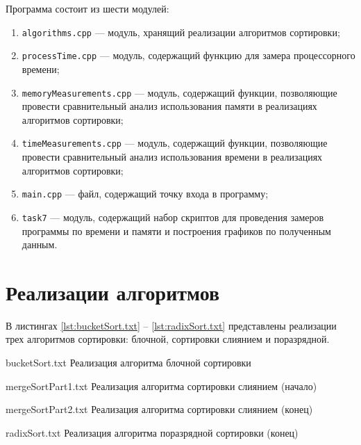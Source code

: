Программа состоит из шести модулей: 

\begin{enumerate}[label={\arabic*)}]
	\item \texttt{algorithms.cpp} --- модуль, хранящий реализации алгоритмов сортировки;
	\item \texttt{processTime.cpp} --- модуль, содержащий функцию для замера процессорного времени;
	\item \texttt{memoryMeasurements.cpp} --- модуль, содержащий функции, позволяющие провести сравнительный анализ использования памяти в реализациях алгоритмов сортировки;
	\item \texttt{timeMeasurements.cpp} --- модуль, содержащий функции, позволяющие провести сравнительный анализ использования времени в реализациях алгоритмов сортировки;
	\item \texttt{main.cpp} --- файл, содержащий точку входа в программу;
	\item \texttt{task7} --- модуль, содержащий набор скриптов для проведения замеров программы по времени и памяти и построения графиков по полученным данным.
\end{enumerate}

\clearpage

\section{Реализации алгоритмов}

В листингах \ref{lst:bucketSort.txt} -- \ref{lst:radixSort.txt} представлены реализации трех алгоритмов сортировки: блочной, сортировки слиянием и поразрядной.

{bucketSort.txt} %
{Реализация алгоритма блочной сортировки} %

\clearpage

{mergeSortPart1.txt} %
{Реализация алгоритма сортировки слиянием (начало)} %

\clearpage

{mergeSortPart2.txt} %
{Реализация алгоритма сортировки слиянием (конец)} %

\clearpage

{radixSort.txt} %
{Реализация алгоритма поразрядной сортировки (конец)} %

